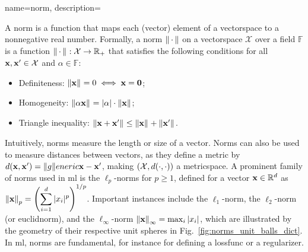 
{name={norm},
	description={A norm is a \gls{function} that maps each (\gls{vector}) element 
		of a \gls{vectorspace} to a nonnegative real number. Formally, a norm 
		$\normgeneric{\, \cdot \,}{}$ on a \gls{vectorspace} $\mathcal{X}$ over a \gls{field} $\mathbb{F}$ is a 
		\gls{function} $\normgeneric{\, \cdot \,}{}: \mathcal{X} \to \mathbb{R}_{+}$ 
		that satisfies the following conditions \cite{HornMatAnalysis} for all ${\bf x}, {\bf x}' \in \mathcal{X}$ 
		and $\alpha \in \mathbb{F}$:
		\begin{itemize}
			\item Definiteness: $\normgeneric{\featurevec}{} = 0 \iff \featurevec = \mathbf{0}$;
			\item Homogeneity: $\normgeneric{\alpha \featurevec}{} = |\alpha| \cdot \normgeneric{\featurevec}{}$;
			\item Triangle inequality: $\normgeneric{\featurevec + \featurevec'}{} \leq \normgeneric{\featurevec}{} + \normgeneric{\featurevec'}{}$.
		\end{itemize}
		Intuitively, norms measure the length or size of a \gls{vector}.
		Norms can also be used to measure distances between \glspl{vector}, as they define a \gls{metric} by 
		$d({\bf x},{\bf x}') = \Vert {g} \Vert eneric{{\bf x} - {\bf x}'}{}$,
		making $(\mathcal{X}, d(\cdot,\cdot))$ a \gls{metricspace}.
		A prominent family of norms used in \gls{ml} is the $\ell_p$-norms for $p \geq 1$, 
		defined for a \gls{vector} ${\bf x} \in \mathbb{R}^d$ as
		$\normgeneric{\featurevec}{p} = \left( \displaystyle \sum_{i=1}^\featuredim |\feature_i|^p \right)^{1/p}$.
		Important instances include the $\ell_1$-norm, the $\ell_2$-norm (or \gls{euclidnorm}), 
		and the $\ell_\infty$-norm $\normgeneric{\featurevec}{\infty} = \max_i |\feature_i|$, which are illustrated
		by the geometry of their respective unit spheres in Fig.\ \ref{fig:norms_unit_balls_dict}.
		In \gls{ml}, norms are fundamental, for instance for defining a \gls{lossfunc} or a \gls{regularizer}. 
}}
